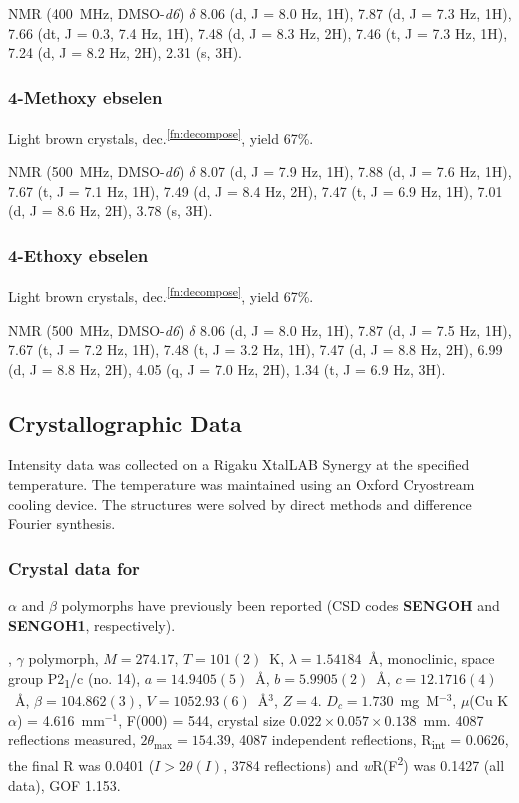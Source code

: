 \begin{refsection}
 NMR (400~MHz, DMSO-\emph{d6}) $\delta$ 8.06 (d, J = 8.0 Hz, 1H), 7.87 (d, J = 7.3 Hz, 1H), 7.66 (dt, J = 0.3, 7.4 Hz, 1H), 7.48 (d, J = 8.3 Hz, 2H), 7.46 (t, J = 7.3 Hz, 1H), 7.24 (d, J = 8.2 Hz, 2H), 2.31 (s, 3H).

\subsubsection{4-Methoxy ebselen }
Light brown crystals, dec.\textsuperscript{\ref{fn:decompose}}, yield 67\%.

 NMR (500~MHz, DMSO-\emph{d6}) $\delta$ 8.07 (d, J = 7.9 Hz, 1H), 7.88 (d, J = 7.6 Hz, 1H), 7.67 (t, J = 7.1 Hz, 1H), 7.49 (d, J = 8.4 Hz, 2H), 7.47 (t, J = 6.9 Hz, 1H), 7.01 (d, J = 8.6 Hz, 2H), 3.78 (s, 3H).

\subsubsection{4-Ethoxy ebselen }
Light brown crystals, dec.\textsuperscript{\ref{fn:decompose}}, yield 67\%.

 NMR (500~MHz, DMSO-\emph{d6}) $\delta$ 8.06 (d, J = 8.0 Hz, 1H), 7.87 (d, J = 7.5 Hz, 1H), 7.67 (t, J = 7.2 Hz, 1H), 7.48 (t, J = 3.2 Hz, 1H), 7.47 (d, J = 8.8 Hz, 2H), 6.99 (d, J = 8.8 Hz, 2H), 4.05 (q, J = 7.0 Hz, 2H), 1.34 (t, J = 6.9 Hz, 3H).


\subsection{Crystallographic Data}
Intensity data was collected on a Rigaku XtalLAB Synergy at the specified temperature. The temperature was maintained using an Oxford Cryostream cooling device. The structures were solved by direct methods and difference Fourier synthesis.\autocite{Sheldrick2015}


\subsubsection{Crystal data for \texorpdfstring{}{C13 H9 N O Se}}
$\alpha$ and $\beta$ polymorphs have previously been reported (CSD codes \textbf{SENGOH} and \textbf{SENGOH1}, respectively).\autocite{Dupont1990StructuresII}

, $\gamma$ polymorph, $M=274.17$, $T=101(2)$~K, $\lambda=1.54184$~\AA, monoclinic, space group P2\textsubscript{1}/c (no. 14), $a = 14.9405(5)$~\AA, $b = 5.9905(2)$~\AA, $c = 12.1716(4)$~\AA, $\beta = 104.862(3)$\degree, $V = 1052.93(6)$~\AA$^{3}$, $Z = 4$. $D_{c}= 1.730$~mg~M$^{-3}$, $\mu$(Cu K$\alpha$) = 4.616~mm$^{-1}$, F(000) = 544, crystal size $0.022 \times 0.057 \times 0.138$~mm. 4087 reflections measured, $2\theta_{\mathrm{max}}=154.39$\degree, 4087 independent reflections, R\textsubscript{int} = 0.0626, the final R was 0.0401 ($I > 2\theta(I)$, 3784 reflections) and \emph{w}R(F\textsuperscript{2}) was 0.1427 (all data), GOF 1.153.


\end{refsection}
